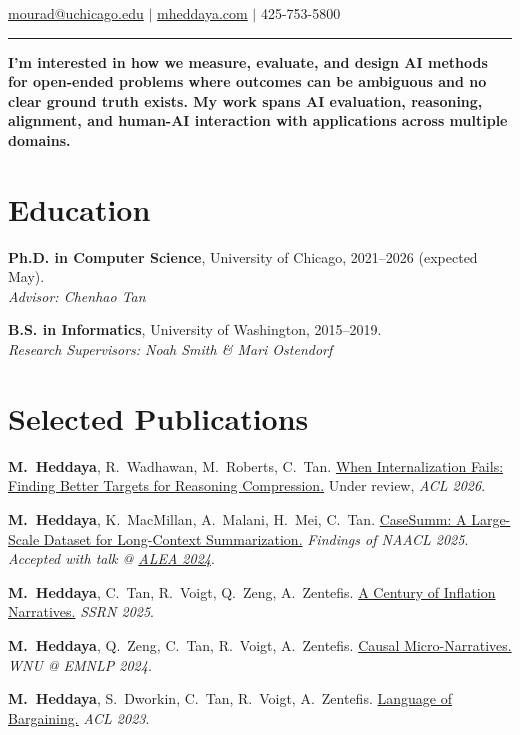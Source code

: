 \documentclass[11pt,letterpaper]{article}
\begin{document}
\hfill{\normalsize \href{mailto:mourad@uchicago.edu}{mourad@uchicago.edu} $|$ \href{https://mheddaya.com}{mheddaya.com} $|$ 425-753-5800}
\vspace{2pt}
\hrule

\vspace{12pt}
\noindent \textbf{I'm interested in how we measure, evaluate, and design AI methods for open-ended problems where outcomes can be ambiguous and no clear ground truth exists. My work spans AI evaluation, reasoning, alignment, and human-AI interaction with applications across multiple domains.}

\section*{Education}

\textbf{Ph.D. in Computer Science}, University of Chicago, 2021--2026 (expected May).\\
\hspace*{2em}\textit{Advisor: Chenhao Tan}

\vspace{4pt}

\textbf{B.S. in Informatics}, University of Washington, 2015--2019.\\
\hspace*{2em}\textit{Research Supervisors: Noah Smith \& Mari Ostendorf}

\section*{Selected Publications}
\vspace{4pt}
\begin{enumerate}[label={[\arabic*]}, leftmargin=2em, topsep=2pt, itemsep=1pt, parsep=0pt]
    \item \textbf{M.\ Heddaya}, R.\ Wadhawan, M.\ Roberts, C.\ Tan. \href{https://mheddaya.com/papers/acl2026_abridge.pdf}{When Internalization Fails: Finding Better Targets for Reasoning Compression.} Under review, \textit{ACL 2026}.
    \item \textbf{M.\ Heddaya}, K.\ MacMillan, A.\ Malani, H.\ Mei, C.\ Tan. \href{https://arxiv.org/abs/2501.00097}{CaseSumm: A Large-Scale Dataset for Long-Context Summarization.} \textit{Findings of NAACL 2025}. \textit{Accepted with talk @ \href{https://alea2024.github.io/}{ALEA 2024}}.
    \item \textbf{M.\ Heddaya}, C.\ Tan, R.\ Voigt, Q.\ Zeng, A.\ Zentefis. \href{https://papers.ssrn.com/sol3/papers.cfm?abstract_id=5259107}{A Century of Inflation Narratives.} \textit{SSRN 2025}.
    \item \textbf{M.\ Heddaya}, Q.\ Zeng, C.\ Tan, R.\ Voigt, A.\ Zentefis. \href{https://aclanthology.org/2024.wnu-1.12/}{Causal Micro-Narratives.} \textit{WNU @ EMNLP 2024}.
    \item \textbf{M.\ Heddaya}, S.\ Dworkin, C.\ Tan, R.\ Voigt, A.\ Zentefis. \href{https://aclanthology.org/2023.acl-long.735/}{Language of Bargaining.} \textit{ACL 2023}.
\end{enumerate}
\end{document}

